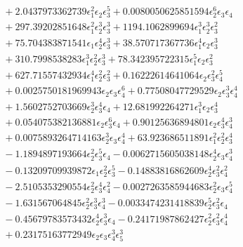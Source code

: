 \documentclass[10pt]{article}
\begin{document}
\begin{align*}
&{}  + 2.0437973362739 \epsilon_{1}^{2} \epsilon_{2} \epsilon_{3}^{5} + 0.0080050625851594 \epsilon_{2}^{6} \epsilon_{3} \epsilon_{4} \\
&{}  + 297.39202851648 \epsilon_{1}^{2} \epsilon_{2}^{3} \epsilon_{3}^{3} + 1194.1062899694 \epsilon_{1}^{3} \epsilon_{2}^{3} \epsilon_{3}^{2} \\
&{}  + 75.704383871541 \epsilon_{1} \epsilon_{2}^{4} \epsilon_{3}^{3} + 38.570717367736 \epsilon_{1}^{4} \epsilon_{2} \epsilon_{3}^{3} \\
&{}  + 310.7998538283 \epsilon_{1}^{3} \epsilon_{2}^{2} \epsilon_{3}^{3} + 78.342395722315 \epsilon_{1}^{5} \epsilon_{2} \epsilon_{3}^{2} \\
&{}  + 627.71557432934 \epsilon_{1}^{4} \epsilon_{2}^{2} \epsilon_{3}^{2} + 0.16222614641064 \epsilon_{2} \epsilon_{3}^{2} \epsilon_{4}^{5} \\
&{}  + 0.0025750181969943 \epsilon_{2} \epsilon_{3} \epsilon_{4}^{6} + 0.77508047729529 \epsilon_{2} \epsilon_{3}^{3} \epsilon_{4}^{4} \\
&{}  + 1.5602752703669 \epsilon_{2}^{3} \epsilon_{3}^{4} \epsilon_{4} + 12.681992264271 \epsilon_{1}^{3} \epsilon_{2} \epsilon_{3}^{4} \\
&{}  + 0.054075382136881 \epsilon_{2} \epsilon_{3}^{6} \epsilon_{4} + 0.90125636894801 \epsilon_{2} \epsilon_{3}^{4} \epsilon_{4}^{3} \\
&{}  + 0.0075893264714163 \epsilon_{2}^{3} \epsilon_{3} \epsilon_{4}^{4} + 63.923686511891 \epsilon_{1}^{2} \epsilon_{2}^{2} \epsilon_{3}^{4} \\
&{}  - 1.1894897193664 \epsilon_{2}^{2} \epsilon_{3}^{5} \epsilon_{4} - 0.0062715605038148 \epsilon_{2}^{4} \epsilon_{3} \epsilon_{4}^{3} \\
&{}  - 0.13209709939872 \epsilon_{1} \epsilon_{2}^{2} \epsilon_{3}^{5} - 0.14883816862609 \epsilon_{2}^{4} \epsilon_{3}^{2} \epsilon_{4}^{2} \\
&{}  - 2.5105353290554 \epsilon_{2}^{2} \epsilon_{3}^{4} \epsilon_{4}^{2} - 0.0027263585944683 \epsilon_{2}^{2} \epsilon_{3} \epsilon_{4}^{5} \\
&{}  - 1.631567064845 \epsilon_{2}^{2} \epsilon_{3}^{3} \epsilon_{4}^{3} - 0.0033474231418839 \epsilon_{2}^{5} \epsilon_{3}^{2} \epsilon_{4} \\
&{}  - 0.45679783573432 \epsilon_{2}^{4} \epsilon_{3}^{3} \epsilon_{4} - 0.24171987862427 \epsilon_{2}^{2} \epsilon_{3}^{2} \epsilon_{4}^{4} \\
&{}  + 0.23175163772949 \epsilon_{2} \epsilon_{3} \epsilon_{4}^{3} \epsilon_{5}^{3} \\

\end{align*}
\end{document}
